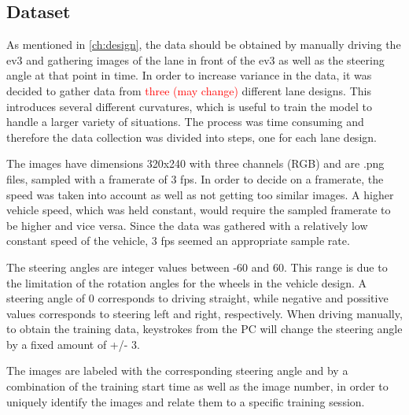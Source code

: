 \subsection{Dataset}\label{ssec:impl-data-dataset}
As mentioned in \autoref{ch:design}, the data should be obtained by manually driving the ev3 and gathering images of the lane in front of the ev3 as well as the steering angle at that point in time. In order to increase variance in the data, it was decided to gather data from \textcolor{red}{three (may change)} different lane designs. This introduces several different curvatures, which is useful to train the model to handle a larger variety of situations. The process was time consuming and therefore the data collection was divided into steps, one for each lane design. 

The images have dimensions 320x240 with three channels (RGB) and are .png files, sampled with a framerate of 3 fps. In order to decide on a framerate, the speed was taken into account as well as not getting too similar images. A higher vehicle speed, which was held constant, would require the sampled framerate to be higher and vice versa. Since the data was gathered with a relatively low constant speed of the vehicle, 3 fps seemed an appropriate sample rate.

The steering angles are integer values between -60 and 60. This range is due to the limitation of the rotation angles for the wheels in the vehicle design.  A steering angle of 0 corresponds to driving straight, while negative and possitive values corresponds to steering left and right, respectively. When driving manually, to obtain the training data, keystrokes from the PC will change the steering angle by a fixed amount of +/- 3. 

The images are labeled with the corresponding steering angle and by a combination of the training start time as well as the image number, in order to uniquely identify the images and relate them to a specific training session.
